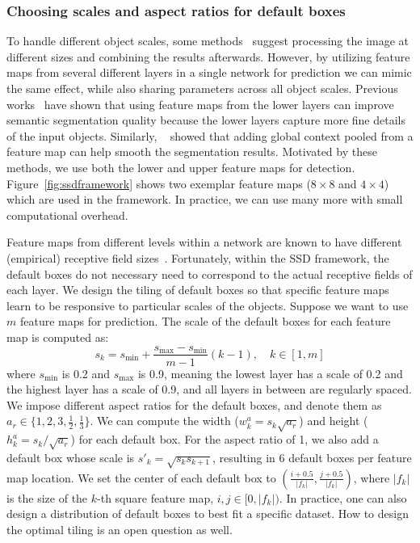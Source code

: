 \documentclass[runningheads]{llncs}
\begin{document}
\subsubsection{Choosing scales and aspect ratios for default boxes}
\label{sec:defaultboxes}
To handle different object scales, some methods~\cite{sermanet2013overfeat,he2014spatial} suggest processing the image at different sizes and combining the results afterwards. However, by utilizing feature maps from several different layers in a single network for prediction we can mimic the same effect, while also sharing parameters across all object scales. Previous works~\cite{long2014fully,hariharan2014hypercolumns} have shown that using feature maps from the lower layers can improve semantic segmentation quality because the lower layers capture more fine details of the input objects. Similarly, ~\cite{liu2015parsenet} showed that adding global context pooled from a feature map can help smooth the segmentation results. Motivated by these methods, we use both the lower and upper feature maps for detection. Figure~\ref{fig:ssdframework} shows two exemplar feature maps ($8\times 8$ and $4\times 4$) which are used in the framework. In practice, we can use many more with small computational overhead.

Feature maps from different levels within a network are known to have different (empirical) receptive field sizes~\cite{zhou2014object}. Fortunately, within the SSD framework, the default boxes do not necessary need to correspond to the actual receptive fields of each layer.
We design the tiling of default boxes so that specific feature maps learn to be responsive to particular scales of the objects. Suppose we want to use $m$ feature maps for prediction. The scale of the default boxes for each feature map is computed as:
\begin{equation}
s_k = s_\text{min} + \frac{s_\text{max} - s_\text{min}}{m - 1} (k - 1),\quad k\in [1, m]
\end{equation}
where $s_\text{min}$ is 0.2 and $s_\text{max}$ is 0.9, meaning the lowest layer has a scale of 0.2 and the highest layer has a scale of 0.9, and all layers in between are regularly spaced. We impose different aspect ratios for the default boxes, and denote them as $a_r \in \{1, 2, 3, \frac{1}{2}, \frac{1}{3}\}$. We can compute the width ($w_k^a = s_k\sqrt{a_r}$) and height ($h_k^a = s_k / \sqrt{a_r}$) for each default box. For the aspect ratio of 1, we also add a default box whose scale is $s'_k = \sqrt{s_k s_{k+1}}$, resulting in 6 default boxes per feature map location. We set the center of each default box to $(\frac{i+0.5}{|f_k|}, \frac{j+0.5}{|f_k|})$, where $|f_k|$ is the size of the $k$-th square feature map, $i, j\in [0, |f_k|)$. In practice, one can also design a distribution of default boxes to best fit a specific dataset. How to design the optimal tiling is an open question as well.
\end{document}
